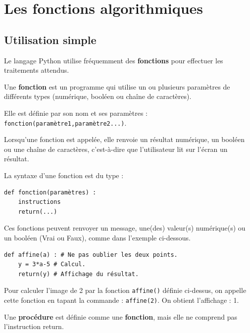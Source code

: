 \section{Les fonctions algorithmiques}
\subsection{Utilisation simple}

Le langage Python utilise fréquemment des \textbf{fonctions} pour effectuer les traitements attendus.

Une \textbf{fonction} est un programme qui utilise un ou plusieurs paramètres de différents types (numérique,
booléen ou chaîne de caractères).

Elle est définie par son nom et ses paramètres : \verb!fonction(paramètre1,paramètre2...)!.

Lorsqu'une fonction est appelée, elle renvoie un résultat numérique, un booléen ou une chaîne de caractères,
c'est-à-dire que l'utilisateur lit sur l'écran un résultat.

La syntaxe d'une fonction est du type :

\begin{lstlisting}
def fonction(paramètres) :
	instructions
	return(...)
\end{lstlisting}

Ces fonctions peuvent renvoyer un message, une(des) valeur(s) numérique(s) ou un booléen (Vrai ou
Faux), comme dans l'exemple ci-dessous.

\begin{lstlisting}
def affine(a) : # Ne pas oublier les deux points.
	y = 3*a-5 # Calcul.
	return(y) # Affichage du résultat.

\end{lstlisting}

Pour calculer l'image de 2 par la fonction \verb!affine()! définie ci-dessus, on appelle cette fonction en tapant
la commande : \verb!affine(2)!. On obtient l'affichage : 1.

\medskip

\begin{Rmq}[]
Une \textbf{procédure} est définie comme une \textbf{fonction},
mais elle ne comprend pas l'instruction return.
\end{Rmq}

